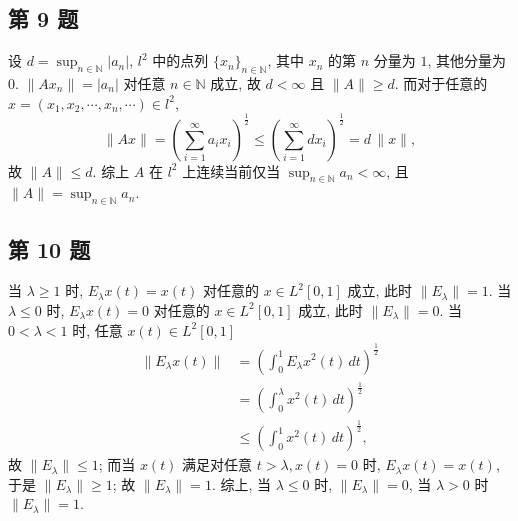 \documentclass[\ROOT/main.tex]{subfiles}
\begin{document}
\subsection{第 9 题}
设 $d = \sup_{n \in \mathbb{N}} | a_n |$,
$l^2$ 中的点列 $\{ x_n \}_{n \in \mathbb{N}}$, 其中 $x_n$ 的第 $n$ 分量为 $1$, 其他分量为 $0$.
$\| A x_n \| = | a_n |$ 对任意 $n \in \mathbb{N}$ 成立,
故 $d < \infty$ 且 $\| A \| \geqslant d$.
而对于任意的 $x = (x_1, x_2, \cdots, x_n, \cdots)\in l^2$,
\[
    \| A x \| = \left( \sum_{i = 1}^{\infty} a_i x_i \right)^{\frac{1}{2}}
    \leqslant \left( \sum_{i = 1}^{\infty} d x_i \right)^{\frac{1}{2}}
    = d \, \| x \|,
\]
故 $\| A \| \leqslant d$.
综上 $A$ 在 $l^2$ 上连续当前仅当 $\sup_{n \in \mathbb{N}} a_n < \infty$,
且 $\| A \| = \sup_{n \in \mathbb{N}} a_n$.

\subsection{第 10 题}
当 $\lambda \geqslant 1$ 时, $E_{\lambda} x(t) = x(t)$ 对任意的 $x \in L^2[0, 1]$ 成立, 此时 $\| E_{\lambda} \| = 1$.
当 $\lambda \leqslant 0$ 时, $E_{\lambda} x(t) = 0$ 对任意的 $x \in L^2[0, 1]$ 成立, 此时 $\| E_{\lambda} \| = 0$. 
当 $ 0 < \lambda < 1$ 时, 任意 $x(t) \in L^2[0, 1]$
\begin{align*}
    \| E_{\lambda} x(t) \| &= \left( \int_0^1 E_{\lambda} x^2(t) \, dt \right)^{\frac{1}{2}} \\
                           &= \left(\int_0^{\lambda} x^2(t) \, dt \right)^{\frac{1}{2}} \\
                           &\leqslant \left( \int_0^1 x^2(t) \, dt \right)^{\frac{1}{2}},
\end{align*}
故 $\| E_{\lambda} \| \leqslant 1$;
而当 $x(t)$ 满足对任意 $t > \lambda, x(t) = 0$ 时, $E_{\lambda} x(t) = x(t)$, 于是 $\| E_{\lambda} \| \geqslant 1$;
故 $\| E_{\lambda} \| = 1$.
综上, 当 $\lambda \leqslant 0$ 时, $\| E_{\lambda} \| = 0$, 当 $\lambda > 0$ 时 $\| E_{\lambda} \| = 1$.
\end{document}
